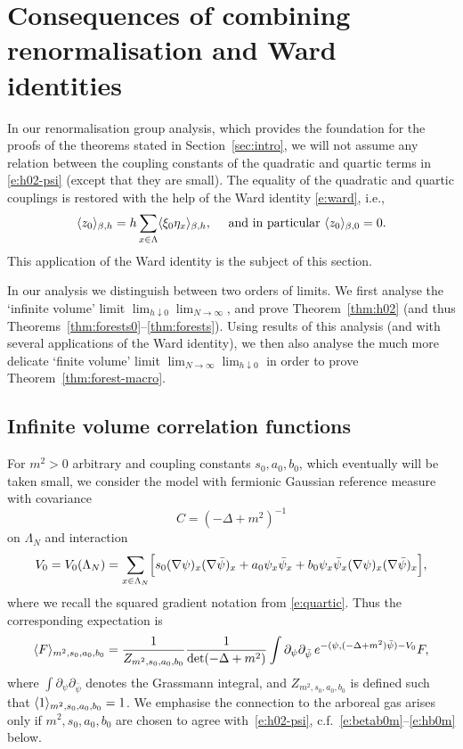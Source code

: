 \documentclass[11pt]{amsart}
\numberwithin{equation}{section}
\numberwithin{theorem}{section}
\newcommand{\1}{{\bf 1}}
\begin{document}
\section{Consequences of combining renormalisation and Ward identities}
\label{sec:ward}

In our renormalisation group analysis, which provides the foundation
for the proofs of the theorems stated in Section~\ref{sec:intro}, we
will not assume any relation between the coupling constants of
the quadratic and quartic terms in \eqref{e:h02-psi} (except that
they are small).  The equality of the quadratic and quartic
couplings is restored with the help of the Ward identity \eqref{e:ward}, i.e.,
\begin{equation} \label{e:ward-bis}
  \langle z_0 \rangle_{\beta,h}
  = h \sum_{x\in\Lambda} \langle \xi_0 \eta_x \rangle_{\beta,h},
  \quad  \text{ and in particular }
  \langle z_0 \rangle_{\beta,0}
  = 0.
\end{equation}
This application of the Ward identity is the subject of this section.

In our analysis we distinguish between two orders of limits.
We first analyse the `infinite volume' limit $\lim_{h\downarrow 0} \lim_{N\to\infty}$, and prove Theorem~\ref{thm:h02}
(and thus Theorems~\ref{thm:forests0}--\ref{thm:forests}).
Using results of this analysis
(and with several applications of the Ward identity),
we then also analyse
the much more delicate `finite volume' limit $\lim_{N\to\infty}\lim_{h\downarrow 0}$
in order to prove Theorem~\ref{thm:forest-macro}.


\subsection{Infinite volume correlation functions}


For $m^2 >0$ arbitrary and coupling constants $s_0,a_0,b_0$, which eventually
will be taken small, we consider the model with fermionic Gaussian reference measure
with covariance
\begin{equation} \label{e:C-Lapm}
  C= (-\Delta+m^2)^{-1}
\end{equation}
on $\Lambda_N$ and interaction 
\begin{equation}
  \label{e:V0}
  V_0
  = V_0(\Lambda_N)=\sum_{x\in\Lambda_N}\Bigl[{s_0 (\nabla \psi)_x(\nabla\bar\psi)_x + a_0 \psi_x\bar\psi_x + b_0 \psi_x\bar\psi_x(\nabla \psi)_x(\nabla \bar\psi)_x}\Bigr],
\end{equation}
where we recall the squared gradient notation from \eqref{e:quartic}.
Thus the corresponding expectation is
\begin{equation} 
  \label{e:psi4}
  \langle F \rangle_{m^2,s_0,a_0,b_0} = 
  \frac{1}{Z_{m^2,s_0,a_0,b_0}}\frac{1}{\det (-\Delta+m^2)} \int \partial_\psi \partial_{\bar\psi}\, e^{-(\psi,(-\Delta+m^2)\bar\psi) - V_0} F,
\end{equation}
where $\int \partial_\psi \partial_{\bar\psi}$ denotes the Grassmann integral,
and $Z_{m^2,s_0,a_0,b_0}$ is defined such that
$\langle 1 \rangle_{m^2,s_0,a_0,b_0}=1$. We emphasise the connection to the arboreal
gas arises only if $m^2,s_0,a_0,b_0$ are chosen to agree
with~\eqref{e:h02-psi}, c.f.\ \eqref{e:betab0m}--\eqref{e:hb0m} below.
\end{document}
